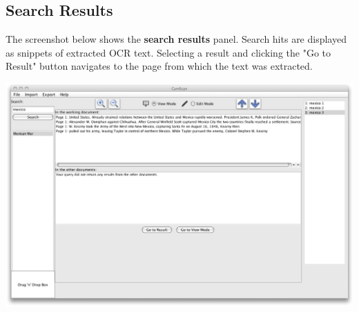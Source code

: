 \documentclass[11pt]{article}
\begin{document}
\subsection*{Search Results}

The screenshot below shows the \textbf{search results} panel. Search hits are displayed as snippets of extracted OCR text. Selecting a result and clicking the "Go to Result" button navigates to the page from which the text was extracted.

\centering
\includegraphics[scale=0.3]{searchresults}
\flushleft
\end{document}
